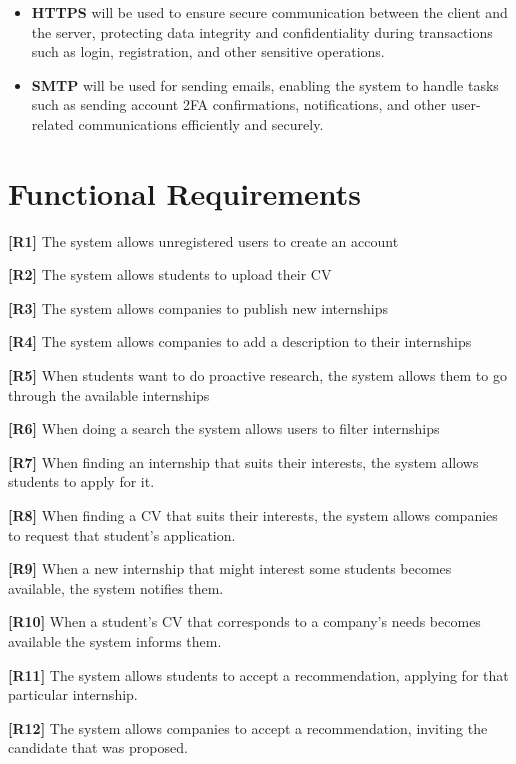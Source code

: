 \begin{itemize}
    \item \textbf{HTTPS} will be used to ensure secure communication between the client and the server, protecting data integrity and confidentiality during transactions such as login, registration, and other sensitive operations.
    
    \item \textbf{SMTP} will be used for sending emails, enabling the system to handle tasks such as sending account 2FA confirmations, notifications, and other user-related communications efficiently and securely.

\end{itemize}

\pagebreak
\section{Functional Requirements}

\textbf{[R1]} The system allows unregistered users to create an account

\textbf{[R2]} The system allows students to upload their CV

\textbf{[R3]} The system allows companies to publish new internships

\textbf{[R4]} The system allows companies to add a description to their internships

\textbf{[R5]} When students want to do proactive research, the system allows them to go through the available internships

\textbf{[R6]} When doing a search the system allows users to filter internships

\textbf{[R7]} When finding an internship that suits their interests, the system allows students to apply for it. 

\textbf{[R8]} When finding a CV that suits their interests, the system allows companies to request that student's application.

\textbf{[R9]} When a new internship that might interest some students becomes available, the system notifies them.

\textbf{[R10]} When a student's CV that corresponds to a company's needs becomes available the system informs them. 

\textbf{[R11]} The system allows students to accept a recommendation, applying for that particular internship. 

\textbf{[R12]} The system allows companies to accept a recommendation, inviting the candidate that was proposed.

